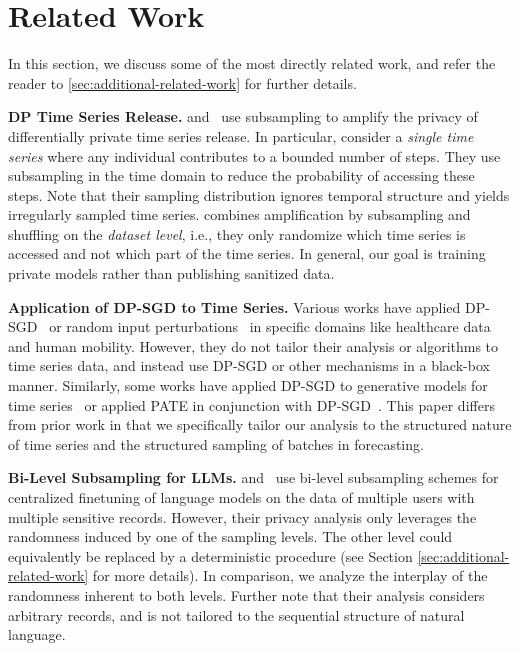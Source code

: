 \section{Related Work}\label{sec:related-work}
In this section, we discuss some of the most directly related work, and refer the reader to \cref{sec:additional-related-work} for further details. 

\textbf{DP Time Series Release.} 
\citet{koga2022privacy} and~\citet{li2023locally} use subsampling to amplify the privacy of differentially private time series release.
In particular, \citet{koga2022privacy} consider a \emph{single time series} where any individual contributes to a bounded number of steps. They use 
subsampling in the time domain to reduce the probability of accessing these steps. 
Note that their sampling distribution ignores temporal structure and yields irregularly sampled time series. 
\citet{li2023locally} combines amplification by subsampling and shuffling on the \emph{dataset level}, i.e., they only randomize which time series is accessed and not which part of the time series.
In general, our goal is training private models rather than publishing sanitized data.







\textbf{Application of DP-SGD to Time Series.}
Various works have 
applied DP-SGD~\cite{mercier2021evaluating,imtiaz2020privacy, arcolezi2022differentially} or random input perturbations~\cite{li2019dp}
in specific domains like healthcare data and human mobility.
However, they do not tailor their analysis or algorithms to time series data, and instead use DP-SGD or other mechanisms in a black-box manner.  
Similarly, some works have applied DP-SGD to generative models for time series~\cite{frigerio2019differentially,wang2020part,torfi2022differentially} or applied PATE \cite{papernot2016semi} in conjunction with DP-SGD~\cite{lamp2024glucosynth}.
This paper differs from prior work in that we specifically tailor our analysis
to the structured nature of time series and the structured sampling of batches in forecasting. 


\textbf{Bi-Level Subsampling for LLMs.}
\citet{charles2024fine} and~\cite{chua2024mind} use bi-level subsampling schemes
for centralized finetuning of language models on the data of multiple users with multiple sensitive records. 
However, their privacy analysis only leverages the randomness induced by one of the sampling levels.
The other level could equivalently be replaced by a deterministic procedure (see Section \ref{sec:additional-related-work} for more details).
In comparison, we analyze the interplay of the randomness inherent to both levels.
Further note that their analysis considers arbitrary records, and is not tailored to the sequential structure of natural language.

